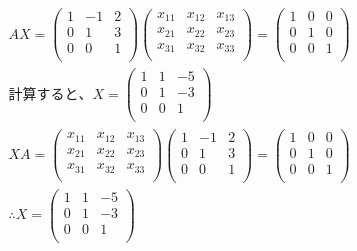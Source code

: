 \documentclass[dvipdfmx,uplatex]{jsarticle}
\begin{document}
  \begin{equation}
    \begin{aligned}
        &AX=\begin{pmatrix} 1 & -1 & 2\\ 0  & 1 & 3\\ 0 & 0 & 1\\ \end{pmatrix} \begin{pmatrix} x_{11} & x_{12} & x_{13}\\ x_{21}  & x_{22} & x_{23}\\ x_{31} & x_{32} & x_{33}\\ \end{pmatrix} = \begin{pmatrix} 1 & 0 & 0\\ 0  & 1 & 0\\ 0 & 0 & 1\\ \end{pmatrix}\nonumber\\
        &計算すると、X=\begin{pmatrix} 1 & 1 & -5\\ 0  & 1 & -3\\ 0 & 0 & 1\\ \end{pmatrix}\nonumber\\
        &XA=\begin{pmatrix} x_{11} & x_{12} & x_{13}\\ x_{21}  & x_{22} & x_{23}\\ x_{31} & x_{32} & x_{33}\\ \end{pmatrix} \begin{pmatrix} 1 & -1 & 2\\ 0  & 1 & 3\\ 0 & 0 & 1\\ \end{pmatrix} = \begin{pmatrix} 1 & 0 & 0\\ 0  & 1 & 0\\ 0 & 0 & 1\\ \end{pmatrix}\nonumber\\
        &\therefore X=\begin{pmatrix} 1 & 1 & -5\\ 0  & 1 & -3\\ 0 & 0 & 1\\ \end{pmatrix}\nonumber\\
    \end{aligned}
  \end{equation}
\end{document}
